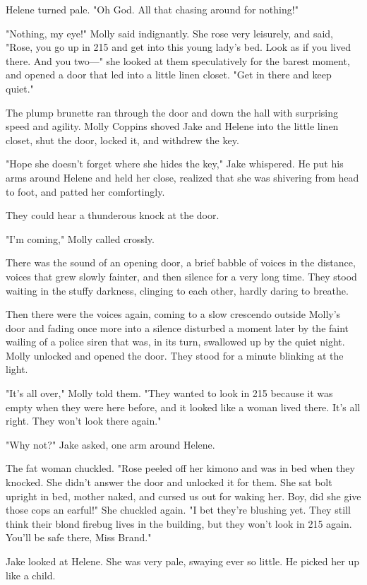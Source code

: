 \documentclass{novel}
\begin{document}
Helene turned pale. "Oh God. All that chasing around for nothing!"

"Nothing, my eye!" Molly said indignantly. She rose very leisurely, and said, "Rose, you go up in 215 and get into this young lady’s bed. Look as if you lived there. And you two—" she looked at them speculatively for the barest moment, and opened a door that led into a little linen closet. "Get in there and keep quiet."

The plump brunette ran through the door and down the hall with surprising speed and agility. Molly Coppins shoved Jake and Helene into the little linen closet, shut the door, locked it, and withdrew the key.

"Hope she doesn’t forget where she hides the key," Jake whispered. He put his arms around Helene and held her close, realized that she was shivering from head to foot, and patted her comfortingly.

They could hear a thunderous knock at the door.

"I’m coming," Molly called crossly.

There was the sound of an opening door, a brief babble of voices in the distance, voices that grew slowly fainter, and then silence for a very long time. They stood waiting in the stuffy darkness, clinging to each other, hardly daring to breathe.

Then there were the voices again, coming to a slow crescendo outside Molly’s door and fading once more into a silence disturbed a moment later by the faint wailing of a police siren that was, in its turn, swallowed up by the quiet night. Molly unlocked and opened the door. They stood for a minute blinking at the light.

"It’s all over," Molly told them. "They wanted to look in 215 because it was empty when they were here before, and it looked like a woman lived there. It’s all right. They won’t look there again."

"Why not?" Jake asked, one arm around Helene.

The fat woman chuckled. "Rose peeled off her kimono and was in bed when they knocked. She didn’t answer the door and unlocked it for them. She sat bolt upright in bed, mother naked, and cursed us out for waking her. Boy, did she give those cops an earful!" She chuckled again. "I bet they’re blushing yet. They still think their blond firebug lives in the building, but they won’t look in 215 again. You’ll be safe there, Miss Brand."

Jake looked at Helene. She was very pale, swaying ever so little. He picked her up like a child.
\end{document}
